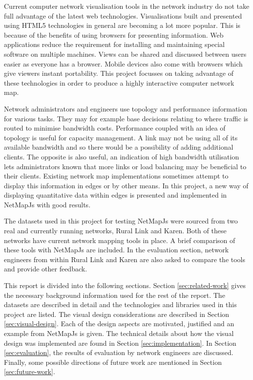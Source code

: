 \documentclass[11pt, a4paper]{article}
\begin{document}
Current computer network visualisation tools in the network industry do not take
full advantage of the latest web technologies. Visualisations built and
presented using HTML5 technologies in general are becoming a lot more popular.
This is because of the benefits of using browsers for presenting information.
Web applications reduce the requirement for installing and maintaining special
software on multiple machines. Views can be shared and discussed between users
easier as everyone has a browser. Mobile devices also come with browsers which
give viewers instant portability. This project focusses on taking advantage of
these technologies in order to produce a highly interactive computer network
map.

Network administrators and engineers use topology and performance information
for various tasks. They may for example base decisions relating to where traffic
is routed to minimise bandwidth costs. Performance coupled with an idea of
topology is useful for capacity management. A link may not be using all of its
available bandwidth and so there would be a possibility of adding additional
clients. The opposite is also useful, an indication of high bandwidth
utilisation lets administrators known that more links or load balancing may be
beneficial to their clients. Existing network map implementations sometimes
attempt to display this information in edges or by other means. In this project,
a new way of displaying quantitative data within edges is presented and
implemented in NetMapJs with good results.


The datasets used in this project for testing NetMapJs were sourced from two
real and currently running networks, Rural Link and Karen. Both of these
networks have current network mapping tools in place. A brief comparison of
these tools with NetMapJs are included. In the evaluation section, network
engineers from within Rural Link and Karen are also asked to compare the tools
and provide other feedback. 

This report is divided into the following sections. Section
\ref{sec:related-work} gives the necessary background information used for the
rest of the report. The datasets are described in detail and the technologies
and libraries used in this project are listed. The visual design considerations
are described in Section \ref{sec:visual-design}. Each of the design aspects
are motivated, justified and an example from NetMapJs is given. The technical
details about how the visual design was implemented are found in Section
\ref{sec:implementation}. In Section \ref{sec:evaluation}, the results of
evaluation by network engineers are discussed. Finally, some possible directions
of future work are mentioned in Section \ref{sec:future-work}.
\end{document}
